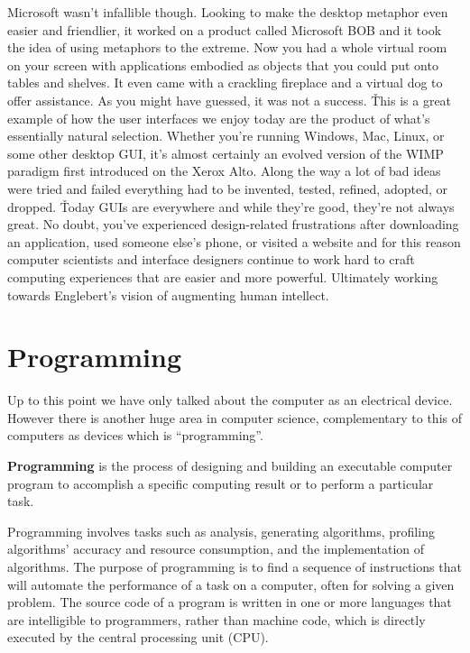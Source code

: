 Microsoft wasn't infallible though. Looking to make the desktop metaphor even easier and friendlier, it worked on a
product called Microsoft BOB and it took the idea of using metaphors to the extreme. Now you had a whole virtual room
on your screen with applications embodied as objects that you could put onto tables and shelves. It even came with a
crackling fireplace and a virtual dog to offer assistance. As you might have guessed, it was not a success. \v

This is a great example of how the user interfaces we enjoy today are the product of what's essentially natural
selection. Whether you're running Windows, Mac, Linux, or some other desktop GUI, it's almost certainly an evolved
version of the WIMP paradigm first introduced on the Xerox Alto. Along the way a lot of bad ideas were tried and
failed everything had to be invented, tested, refined, adopted, or dropped. \v

Today GUIs are everywhere and while they're good, they're not always great. No doubt, you've experienced
design-related frustrations after downloading an application, used someone else's phone, or visited a website and for
this reason computer scientists and interface designers continue to work hard to craft computing experiences that are
easier and more powerful. Ultimately working towards Englebert's vision of augmenting human intellect.

\section{Programming}

Up to this point we have only talked about the computer as an electrical device. However there is another huge area
in computer science, complementary to this of computers as devices which is ``programming''.

\bd[Programming]
\textbf{Programming} is the process of designing and building an executable computer program to accomplish a specific
computing result or to perform a particular task.
\ed

Programming involves tasks such as analysis, generating algorithms, profiling algorithms' accuracy and resource
consumption, and the implementation of algorithms. The purpose of programming is to find a sequence of instructions
that will automate the performance of a task on a computer, often for solving a given problem. The source code of a
program is written in one or more languages that are intelligible to programmers, rather than machine code, which is
directly executed by the central processing unit (CPU).

